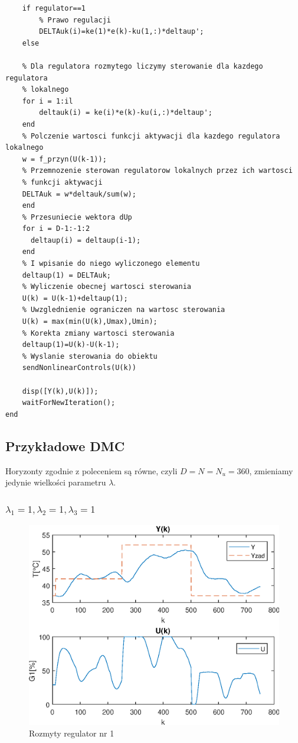 \begin{lstlisting}[style=custommatlab,frame=single,label={zad4_sim_lst},caption={Implementacja regulatora DMC},captionpos=b]
    % Dla regulatora nierozmytego liczymy jedno sterowanie
    if regulator==1
        % Prawo regulacji
        DELTAuk(i)=ke(1)*e(k)-ku(1,:)*deltaup';   
    else
    
    % Dla regulatora rozmytego liczymy sterowanie dla kazdego regulatora
    % lokalnego
    for i = 1:il
        deltauk(i) = ke(i)*e(k)-ku(i,:)*deltaup';       
    end   
    % Polczenie wartosci funkcji aktywacji dla kazdego regulatora lokalnego
    w = f_przyn(U(k-1));
    % Przemnozenie sterowan regulatorow lokalnych przez ich wartosci
    % funkcji aktywacji
    DELTAuk = w*deltauk/sum(w);
    end
    % Przesuniecie wektora dUp
    for i = D-1:-1:2
      deltaup(i) = deltaup(i-1);
    end
    % I wpisanie do niego wyliczonego elementu
    deltaup(1) = DELTAuk;
    % Wyliczenie obecnej wartosci sterowania
    U(k) = U(k-1)+deltaup(1);
    % Uwzglednienie ograniczen na wartosc sterowania
    U(k) = max(min(U(k),Umax),Umin);
    % Korekta zmiany wartosci sterowania
    deltaup(1)=U(k)-U(k-1);
    % Wyslanie sterowania do obiektu
    sendNonlinearControls(U(k))
    
    disp([Y(k),U(k)]);
    waitForNewIteration();
end
\end{lstlisting} 

\subsection {Przykładowe DMC}

Horyzonty zgodnie z poleceniem są równe, czyli $D=N=N_{u}=360$, zmieniamy jedynie wielkości parametru $\lambda$.

\subsubsection{$\lambda_{1}=1, \lambda_{2}=1, \lambda_{3}=1$ }

\begin{figure}[h!]
	\centering
	\includegraphics[scale=1]{Rys/DMC.eps}
	\caption{Rozmyty regulator nr 1}
	\label{dmc1}
\end{figure}


